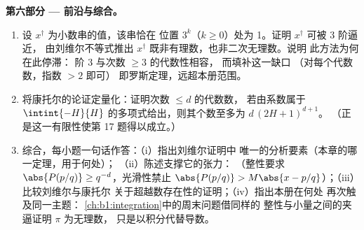 \begin{problem}
\medskip
\noindent\textbf{第六部分 --- 前沿与综合。}
\begin{enumerate}[resume]
  \item 设 $x^\dagger$ 为小数串的值，该串恰在
        位置 $3^k$（$k \geq 0$）处为 1。证明
        $x^\dagger$ 可被 $3$ 阶逼近，
        由刘维尔不等式推出 $x^\dagger$ 既非有理数，也非二次无理数。说明
        此方法为何在此停滞：
        阶 $3$ 与次数 $\geq 3$ 的代数性相容，
        而填补这一缺口
        （对每个代数数，指数 $> 2$ 即可）
        即罗斯定理，远超本册范围。
  \item 将康托尔的论证定量化：证明次数 $\leq d$ 的代数数，
        若由系数属于 $\intint{-H}{H}$ 的多项式给出，则其个数至多为
        $d\,(2H + 1)^{d+1}$。
        （正是这一有限性使第 17 题得以成立。）
  \item 综合，每小题一句话作答：（i）指出刘维尔证明中
        唯一的分析要素（本章的哪一定理，用于何处）；
        （ii）陈述支撑它的张力：
        （整性要求 $\abs{P(p/q)} \geq
        q^{-d}$，光滑性禁止 $\abs{P(p/q)} > M\abs{x -
        p/q}$）；（iii）比较刘维尔与康托尔
        关于超越数存在性的证明；（iv）指出本册在何处
        再次触及同一主题：
        \cref{ch:b1:integration}中的周末问题借同样的
        整性与小量之间的夹逼证明 $\pi$ 为无理数，
        只是以积分代替导数。
\end{enumerate}
\end{problem}
